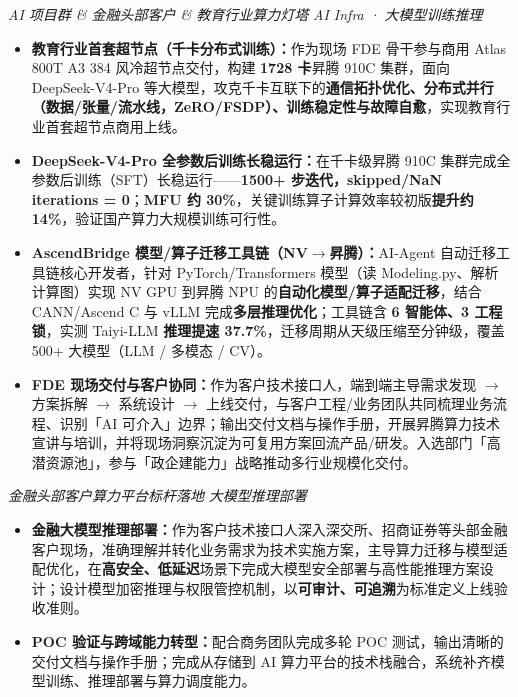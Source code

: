 \documentclass{resume}
\begin{document}
\textit{AI 项目群 \& 金融头部客户 \& 教育行业算力灯塔} \quad \textit{AI Infra · 大模型训练推理}
\begin{itemize}
  \item \textbf{教育行业首套超节点（千卡分布式训练）：}作为现场 FDE 骨干参与商用 Atlas 800T A3 384 风冷超节点交付，构建 \textbf{1728 卡}昇腾 910C 集群，面向 DeepSeek-V4-Pro 等大模型，攻克千卡互联下的\textbf{通信拓扑优化、分布式并行（数据/张量/流水线，ZeRO/FSDP）、训练稳定性与故障自愈}，实现教育行业首套超节点商用上线。
  \item \textbf{DeepSeek-V4-Pro 全参数后训练长稳运行：}在千卡级昇腾 910C 集群完成全参数后训练（SFT）长稳运行——\textbf{1500+ 步迭代，skipped/NaN iterations = 0}；\textbf{MFU 约 30\%}，关键训练算子计算效率较初版\textbf{提升约 14\%}，验证国产算力大规模训练可行性。
  \item \textbf{AscendBridge 模型/算子迁移工具链（NV$\to$昇腾）：}AI-Agent 自动迁移工具链核心开发者，针对 PyTorch/Transformers 模型（读 Modeling.py、解析计算图）实现 NV GPU 到昇腾 NPU 的\textbf{自动化模型/算子适配迁移}，结合 CANN/Ascend C 与 vLLM 完成\textbf{多层推理优化}；工具链含 \textbf{6 智能体、3 工程锁}，实测 Taiyi-LLM \textbf{推理提速 37.7\%}，迁移周期从天级压缩至分钟级，覆盖 500+ 大模型（LLM / 多模态 / CV）。
  \item \textbf{FDE 现场交付与客户协同：}作为客户技术接口人，端到端主导需求发现 $\to$ 方案拆解 $\to$ 系统设计 $\to$ 上线交付，与客户工程/业务团队共同梳理业务流程、识别「AI 可介入」边界；输出交付文档与操作手册，开展昇腾算力技术宣讲与培训，并将现场洞察沉淀为可复用方案回流产品/研发。入选部门「高潜资源池」，参与「政企建能力」战略推动多行业规模化交付。
\end{itemize}

\textit{金融头部客户算力平台标杆落地} \quad \textit{大模型推理部署}
\begin{itemize}
  \item \textbf{金融大模型推理部署：}作为客户技术接口人深入深交所、招商证券等头部金融客户现场，准确理解并转化业务需求为技术实施方案，主导算力迁移与模型适配优化，在\textbf{高安全、低延迟}场景下完成大模型安全部署与高性能推理方案设计；设计模型加密推理与权限管控机制，以\textbf{可审计、可追溯}为标准定义上线验收准则。
  \item \textbf{POC 验证与跨域能力转型：}配合商务团队完成多轮 POC 测试，输出清晰的交付文档与操作手册；完成从存储到 AI 算力平台的技术栈融合，系统补齐模型训练、推理部署与算力调度能力。
\end{itemize}
\end{document}
